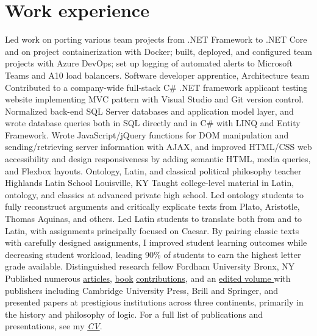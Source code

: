 \section{Work experience}
{Led work on porting various team projects from .NET Framework to .NET Core and on project containerization with Docker; built, deployed, and configured team projects with Azure DevOps; set up logging of automated alerts to Microsoft Teams and A10 load balancers.
}
{Software developer apprentice, Architecture team}
{}
{}
{}
{Contributed to a company-wide full-stack C\# .NET framework applicant testing website implementing MVC pattern with Visual Studio and Git version control. Normalized back-end SQL Server databases and application model layer, and wrote database queries both in SQL directly and in C\# with LINQ and Entity Framework. Wrote JavaScript/jQuery functions for DOM manipulation and sending/retrieving server information with AJAX, and improved HTML/CSS web accessibility and design responsiveness by adding semantic HTML, media queries, and Flexbox layouts. 
	}
{Ontology, Latin, and classical political philosophy teacher}
{Highlands Latin School}
{Louisville, KY}
{}
{Taught college-level material in Latin, ontology, and classics at advanced private high school. 
	Led ontology students to fully reconstruct arguments 
	and critically explicate texts from Plato, Aristotle, Thomas Aquinas, and others. 
	Led Latin students to translate both from and to Latin, 
	with assignments principally focused on Caesar. 
	By pairing classic texts with carefully designed assignments, 
	I improved student learning outcomes 
	while decreasing student workload, 
	leading 90\% of students to earn the highest letter grade available.}
{Distinguished research fellow}
{Fordham University}
{Bronx, NY}
{}
{Published numerous \href{https://fordham.academia.edu/jacobarchambault}{articles}, \href{https://www.collegepublications.co.uk/dialogues/?00005}{book} \href{https://www.cambridgescholars.com/hylomorphism-and-mereology}{contributions}, and an \href{https://brill.com/view/journals/viv/56/3-4/viv.56.issue-3-4.xml?language=en}{edited volume }
	with publishers including Cambridge University Press, Brill and Springer, 
	and presented papers at prestigious institutions across three continents, 
	primarily in the history and philosophy of logic. 
	For a full list of publications and presentations, see my 
	\href{https://jacobarchambault.com/curriculum-vitae}{\emph{CV}}.}

